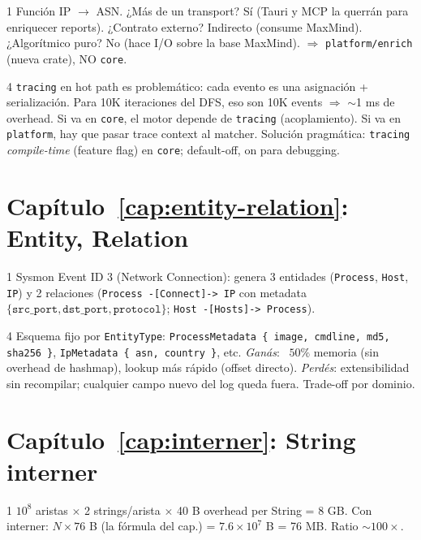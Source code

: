 \begin{solucion}{1}
Función IP $\to$ ASN. ¿Más de un transport? Sí (Tauri y MCP la
querrán para enriquecer reports). ¿Contrato externo? Indirecto
(consume MaxMind). ¿Algorítmico puro? No (hace I/O sobre la base
MaxMind). $\Rightarrow$ \texttt{platform/enrich} (nueva crate),
NO \texttt{core}.
\end{solucion}

\begin{solucion}{4}
\texttt{tracing} en hot path es problemático: cada evento es una
asignación + serialización. Para 10K iteraciones del DFS, eso son
10K events $\Rightarrow$ \(\sim\)1 ms de overhead. Si va en
\texttt{core}, el motor depende de \texttt{tracing} (acoplamiento).
Si va en \texttt{platform}, hay que pasar trace context al matcher.
Solución pragmática: \texttt{tracing} \emph{compile-time} (feature
flag) en \texttt{core}; default-off, on para debugging.
\end{solucion}

\section*{Capítulo~\ref{cap:entity-relation}: Entity, Relation}

\begin{solucion}{1}
Sysmon Event ID 3 (Network Connection): genera 3 entidades
(\texttt{Process}, \texttt{Host}, \texttt{IP}) y 2 relaciones
(\texttt{Process -[Connect]-> IP} con metadata
\(\{\texttt{src\_port}, \texttt{dst\_port}, \texttt{protocol}\}\);
\texttt{Host -[Hosts]-> Process}).
\end{solucion}

\begin{solucion}{4}
Esquema fijo por \texttt{EntityType}: \texttt{ProcessMetadata
\{ image, cmdline, md5, sha256 \}}, \texttt{IpMetadata \{ asn,
country \}}, etc. \emph{Ganás}: ~\(50\%\) memoria (sin overhead
de hashmap), lookup más rápido (offset directo).
\emph{Perdés}: extensibilidad sin recompilar; cualquier campo
nuevo del log queda fuera. Trade-off por dominio.
\end{solucion}

\section*{Capítulo~\ref{cap:interner}: String interner}

\begin{solucion}{1}
\(10^8\) aristas \(\times\) 2 strings/arista \(\times\) 40 B
overhead per String = \(8\) GB. Con interner: \(N \times 76\) B (la
fórmula del cap.) = \(7.6 \times 10^7\) B = 76 MB. Ratio
\(\sim 100\times\).
\end{solucion}

